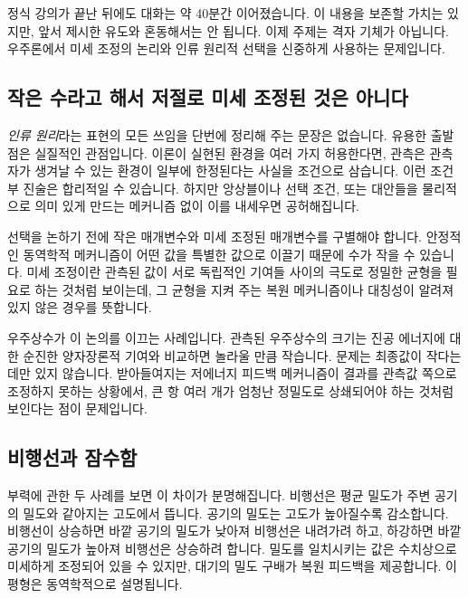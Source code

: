 정식 강의가 끝난 뒤에도 대화는 약 40분간 이어졌습니다. 이 내용을 보존할 가치는 있지만, 앞서 제시한 유도와 혼동해서는 안 됩니다. 이제 주제는 격자 기체가 아닙니다. 우주론에서 미세 조정의 논리와 인류 원리적 선택을 신중하게 사용하는 문제입니다.

\subsection{작은 수라고 해서 저절로 미세 조정된 것은 아니다}

\emph{인류 원리}라는 표현의 모든 쓰임을 단번에 정리해 주는 문장은 없습니다. 유용한 출발점은 실질적인 관점입니다. 이론이 실현된 환경을 여러 가지 허용한다면, 관측은 관측자가 생겨날 수 있는 환경이 일부에 한정된다는 사실을 조건으로 삼습니다. 이런 조건부 진술은 합리적일 수 있습니다. 하지만 앙상블이나 선택 조건, 또는 대안들을 물리적으로 의미 있게 만드는 메커니즘 없이 이를 내세우면 공허해집니다.

선택을 논하기 전에 작은 매개변수와 미세 조정된 매개변수를 구별해야 합니다. 안정적인 동역학적 메커니즘이 어떤 값을 특별한 값으로 이끌기 때문에 수가 작을 수 있습니다. 미세 조정이란 관측된 값이 서로 독립적인 기여들 사이의 극도로 정밀한 균형을 필요로 하는 것처럼 보이는데, 그 균형을 지켜 주는 복원 메커니즘이나 대칭성이 알려져 있지 않은 경우를 뜻합니다.

\begin{classroomqa}
\end{classroomqa}

우주상수가 이 논의를 이끄는 사례입니다. 관측된 우주상수의 크기는 진공 에너지에 대한 순진한 양자장론적 기여와 비교하면 놀라울 만큼 작습니다. 문제는 최종값이 작다는 데만 있지 않습니다. 받아들여지는 저에너지 피드백 메커니즘이 결과를 관측값 쪽으로 조정하지 못하는 상황에서, 큰 항 여러 개가 엄청난 정밀도로 상쇄되어야 하는 것처럼 보인다는 점이 문제입니다.

\subsection{비행선과 잠수함}

부력에 관한 두 사례를 보면 이 차이가 분명해집니다. 비행선은 평균 밀도가 주변 공기의 밀도와 같아지는 고도에서 뜹니다. 공기의 밀도는 고도가 높아질수록 감소합니다. 비행선이 상승하면 바깥 공기의 밀도가 낮아져 비행선은 내려가려 하고, 하강하면 바깥 공기의 밀도가 높아져 비행선은 상승하려 합니다. 밀도를 일치시키는 값은 수치상으로 미세하게 조정되어 있을 수 있지만, 대기의 밀도 구배가 복원 피드백을 제공합니다. 이 평형은 동역학적으로 설명됩니다.

